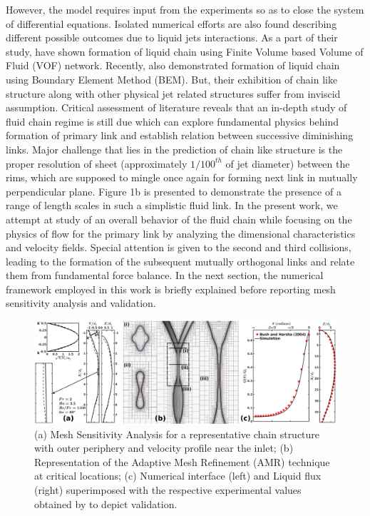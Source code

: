\documentclass{jfm}
\begin{document}
However, the model requires input from the experiments so as to close the system of differential equations. Isolated numerical efforts are also found describing different possible outcomes due to liquid jets interactions. As a part of their study, \cite{ma2011atomization,chen2013high} have shown formation of liquid chain using Finite Volume based Volume of Fluid (VOF) network. Recently, \cite{da2016surface} also demonstrated formation of liquid chain using Boundary Element Method (BEM). But, their exhibition of chain like structure along with other physical jet related structures suffer from inviscid assumption. Critical assessment of literature reveals that an in-depth study of fluid chain regime is still due which can explore fundamental physics behind formation of primary link and establish relation between successive diminishing links.  Major challenge that lies in the prediction of chain like structure is the proper resolution of sheet (approximately $1/100^{th}$ of jet diameter) between the rims, which are supposed to mingle once again for forming next link in mutually perpendicular plane. Figure 1b is presented to demonstrate the presence of  a range of length scales in such a simplistic fluid link.  In the present work, we attempt at study of an overall behavior of the fluid chain  while focusing on the physics of flow for the primary link by analyzing the dimensional characteristics and velocity fields. Special attention is given to the second and third collisions, leading to the formation of the subsequent mutually orthogonal links and relate them from fundamental force balance. In the next section, the numerical framework employed in this work is briefly explained before reporting mesh sensitivity analysis and validation.
\begin{figure}
	\centering
	\includegraphics[width=\linewidth]{Figure2}
	\caption{(a) Mesh Sensitivity Analysis for a representative chain structure with outer periphery and velocity profile near the inlet; (b) Representation of the Adaptive Mesh Refinement (AMR) technique at critical locations; (c) Numerical interface (left) and Liquid flux (right) superimposed with the respective experimental values obtained by \cite{bush2004collision} to depict validation.}
	\label{Figure::gisetal}
\end{figure}
\end{document}
